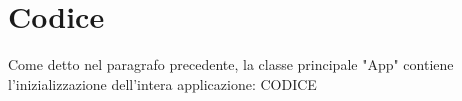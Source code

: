 \section{Codice}
\label{sec:codice}
Come detto nel paragrafo precedente, la classe principale "App" contiene l'inizializzazione dell'intera applicazione:
CODICE 